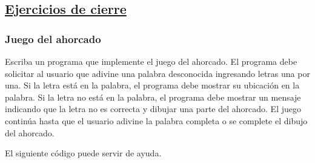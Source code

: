 {\scriptsize
  \lstset{inputencoding=utf8/latin1}
  
}

\subsection*{\underline{Ejercicios de cierre}}
\subsubsection{Juego del ahorcado}
Escriba un programa que implemente el juego del ahorcado.
El programa debe solicitar al usuario que adivine una palabra desconocida ingresando letras una por una.
Si la letra está en la palabra, el programa debe mostrar su ubicación en la palabra.
Si la letra no está en la palabra, el programa debe mostrar un mensaje indicando que la letra no es correcta y dibujar una parte del ahorcado.
El juego continúa hasta que el usuario adivine la palabra completa o se complete el dibujo del ahorcado.

El siguiente código puede servir de ayuda.

\lstset{inputencoding=utf8/latin1}

